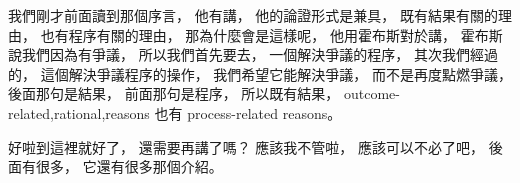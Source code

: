 \hypertarget{w06:cue:2019}{}我們剛才前面讀到那個序言，
\hypertarget{w06:cue:2020}{}他有講，
\hypertarget{w06:cue:2021}{}他的論證形式是兼具，
\hypertarget{w06:cue:2022}{}既有結果有關的理由，
\hypertarget{w06:cue:2023}{}也有程序有關的理由，
\hypertarget{w06:cue:2024}{}那為什麼會是這樣呢，
\hypertarget{w06:cue:2025}{}他用霍布斯對於講，
\hypertarget{w06:cue:2026}{}霍布斯說我們因為有爭議，
\hypertarget{w06:cue:2027}{}所以我們首先要去，
\hypertarget{w06:cue:2028}{}一個解決爭議的程序，
\hypertarget{w06:cue:2029}{}其次我們經過的，
\hypertarget{w06:cue:2030}{}這個解決爭議程序的操作，
\hypertarget{w06:cue:2031}{}我們希望它能解決爭議，
\hypertarget{w06:cue:2032}{}而不是再度點燃爭議，
\hypertarget{w06:cue:2033}{}後面那句是結果，
\hypertarget{w06:cue:2034}{}前面那句是程序，
\hypertarget{w06:cue:2035}{}所以既有結果，
\hypertarget{w06:cue:2036}{}outcome-related,rational,reasons
\hypertarget{w06:cue:2037}{}也有 process-related reasons。

\hypertarget{w06:cue:2038}{}好啦到這裡就好了，
\hypertarget{w06:cue:2039}{}還需要再講了嗎？
\hypertarget{w06:cue:2040}{}應該我不管啦，
\hypertarget{w06:cue:2041}{}應該可以不必了吧，
\hypertarget{w06:cue:2042}{}後面有很多，
\hypertarget{w06:cue:2043}{}它還有很多那個介紹。

